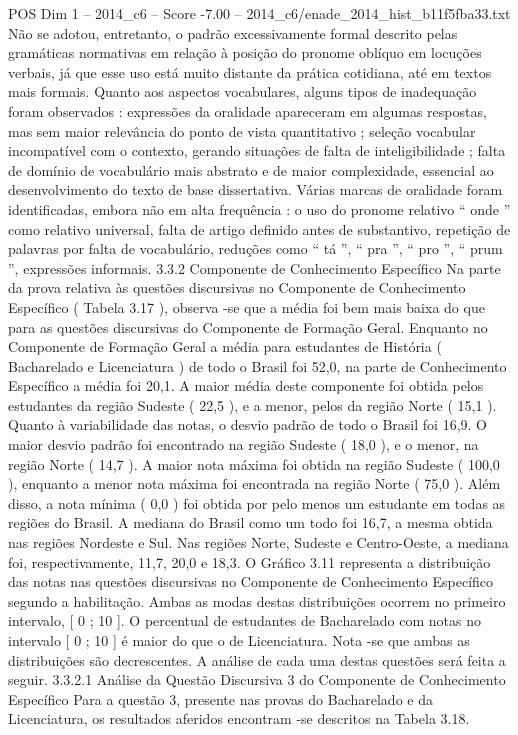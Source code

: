 \begin{textsample}{POS Dim 1 – 2014\_c6 – Score -7.00 – 2014\_c6/enade\_2014\_hist\_b11f5fba33.txt}
Não se adotou, entretanto, o padrão excessivamente formal descrito pelas gramáticas normativas em relação à posição do pronome oblíquo em locuções verbais, já que esse uso está muito distante da prática cotidiana, até em textos mais formais.
Quanto aos aspectos vocabulares, alguns tipos de inadequação foram observados : expressões da oralidade apareceram em algumas respostas, mas sem maior relevância do ponto de vista quantitativo ; seleção vocabular incompatível com o contexto, gerando situações de falta de inteligibilidade ; falta de domínio de vocabulário mais abstrato e de maior complexidade, essencial ao desenvolvimento do texto de base dissertativa.
Várias marcas de oralidade foram identificadas, embora não em alta frequência : o uso do pronome relativo “ onde ” como relativo universal, falta de artigo definido antes de substantivo, repetição de palavras por falta de vocabulário, reduções como “ tá ”, “ pra ”, “ pro ”, “ prum ”, expressões informais. 3.3.2 Componente de Conhecimento Específico Na parte da prova relativa às questões discursivas no Componente de Conhecimento Específico ( Tabela 3.17 ), observa -se que a média foi bem mais baixa do que para as questões discursivas do Componente de Formação Geral.
Enquanto no Componente de Formação Geral a média para estudantes de História ( Bacharelado e Licenciatura ) de todo o Brasil foi 52,0, na parte de Conhecimento Específico a média foi 20,1.
A maior média deste componente foi obtida pelos estudantes da região Sudeste ( 22,5 ), e a menor, pelos da região Norte ( 15,1 ).
Quanto à variabilidade das notas, o desvio padrão de todo o Brasil foi 16,9.
O maior desvio padrão foi encontrado na região Sudeste ( 18,0 ), e o menor, na região Norte ( 14,7 ).
A maior nota máxima foi obtida na região Sudeste ( 100,0 ), enquanto a menor nota máxima foi encontrada na região Norte ( 75,0 ).
Além disso, a nota mínima ( 0,0 ) foi obtida por pelo menos um estudante em todas as regiões do Brasil.
A mediana do Brasil como um todo foi 16,7, a mesma obtida nas regiões Nordeste e Sul.
Nas regiões Norte, Sudeste e Centro-Oeste, a mediana foi, respectivamente, 11,7, 20,0 e 18,3.
O Gráfico 3.11 representa a distribuição das notas nas questões discursivas no Componente de Conhecimento Específico segundo a habilitação.
Ambas as modas destas distribuições ocorrem no primeiro intervalo, [ 0 ; 10 ].
O percentual de estudantes de Bacharelado com notas no intervalo [ 0 ; 10 ] é maior do que o de Licenciatura.
Nota -se que ambas as distribuições são decrescentes.
A análise de cada uma destas questões será feita a seguir. 3.3.2.1 Análise da Questão Discursiva 3 do Componente de Conhecimento Específico Para a questão 3, presente nas provas do Bacharelado e da Licenciatura, os resultados aferidos encontram -se descritos na Tabela 3.18.

\end{textsample}
